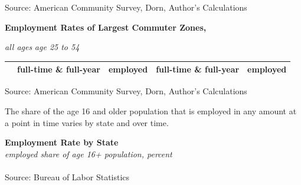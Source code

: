 \documentclass{report}
\newcommand{\tbllink}[1]{\href{https://raw.githubusercontent.com/bdecon/US-chartbook/master/chartbook/data/#1}{\faTable}}
\begin{document}
{\begin{minipage}{0.55\textwidth}
\hspace{-11mm} 

\vspace{-4mm}
\footnotesize{Source: American Community Survey, Dorn, Author's Calculations}
\end{minipage} \hspace{3mm}
\begin{minipage}{0.24\textwidth}
\vspace{-1mm}

\footnotesize 
\end{minipage}
\newpage
\begin{minipage}{1.0\textwidth} 
\normalsize \textbf{Employment Rates of Largest Commuter Zones, }
\vspace{-1mm}

\footnotesize \hspace{42mm} \textit{all ages} \hspace{20mm} \textit{age 25 to 54}\\
 \setlength{\tabcolsep}{3.1pt} \color{black!90}
	{\renewcommand{\arraystretch}{1.55}
		\begin{tabular}{p{24mm} R{15mm} R{15mm} R{15mm} R{15mm}}
		 	& full-time \& full-year & employed & full-time \& full-year & employed \\
			  \hline
		\end{tabular}}	
\vspace{-2mm}

\footnotesize{Source: American Community Survey, Dorn, Author's Calculations}
\vspace{6mm}

\small The share of the age 16 and older population that is employed in any amount at a point in time varies by state and over time. 
\end{minipage}
\vspace{2mm}

\normalsize \textbf{Employment Rate by State}\\
\footnotesize{\textit{employed share of age 16+ population, percent}}\\
\vspace{-2mm}
\hspace{-8mm}  \\
\footnotesize{Source: Bureau of Labor Statistics} \hspace{72mm} \tbllink{state_epop.csv}
\newpage
\begin{minipage}{1.0\textwidth}  
\vspace*{-6mm}


\end{minipage}}
\end{document}
